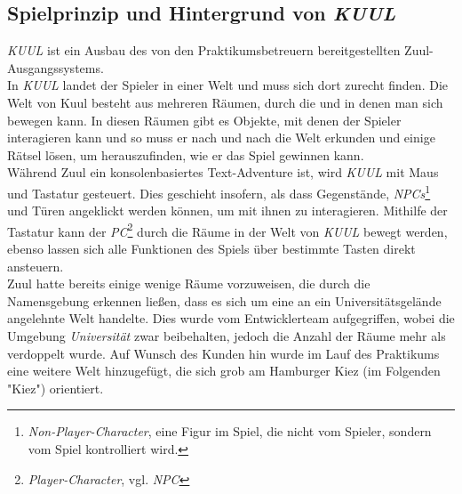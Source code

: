 \documentclass[12pt,twoside]{article}
\theoremstyle{plain}
\theoremstyle{definition}
\theoremstyle{remark}
\begin{document}
\subsection{Spielprinzip und Hintergrund von \textit{KUUL}}
\label{ssec:main_kuul}
\textit{KUUL} ist ein Ausbau des von den Praktikumsbetreuern bereitgestellten Zuul-Ausgangssystems.
\\
In \textit{KUUL} landet der Spieler in einer Welt und muss sich dort zurecht finden. Die Welt von Kuul besteht aus mehreren Räumen, durch die und in denen man sich bewegen kann. In diesen Räumen gibt es Objekte, mit denen der Spieler interagieren kann und so muss er nach und nach die Welt erkunden und einige Rätsel lösen, um herauszufinden, wie er das Spiel gewinnen kann.
\\
Während Zuul ein konsolenbasiertes Text-Adventure ist, wird \textit{KUUL} mit Maus und Tastatur gesteuert.
Dies geschieht insofern, als dass Gegenstände, \textit{NPCs}\footnote{\textit{Non-Player-Character}, eine Figur im Spiel, die nicht vom Spieler, sondern vom Spiel kontrolliert wird.} und Türen angeklickt werden können, um mit ihnen zu interagieren.
Mithilfe der Tastatur kann der \textit{PC}\footnote{\textit{Player-Character}, vgl. \textit{NPC}} durch die Räume in der Welt von \textit{KUUL} bewegt werden, ebenso lassen sich alle Funktionen des Spiels über bestimmte Tasten direkt ansteuern.\\
Zuul hatte bereits einige wenige Räume vorzuweisen, die durch die Namensgebung erkennen ließen, dass es sich um eine an ein Universitätsgelände angelehnte Welt handelte.
Dies wurde vom Entwicklerteam aufgegriffen, wobei die Umgebung \textit{Universität} zwar beibehalten, jedoch die Anzahl der Räume mehr als verdoppelt wurde.
Auf Wunsch des Kunden hin wurde im Lauf des Praktikums eine weitere Welt hinzugefügt, die sich grob am Hamburger Kiez (im Folgenden "Kiez") orientiert.

%
%
\end{document}
